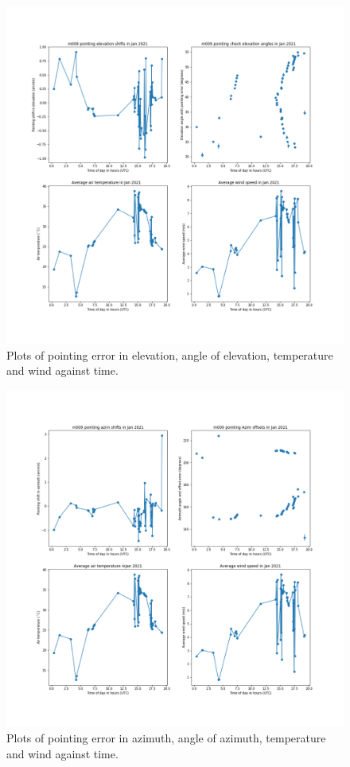 \documentclass{article}
\begin{document}
\begin{figure}[H]
	\includegraphics[scale=0.45]{m009_elev_Jan_mapped.png}
	
	\caption{Plots of pointing error in elevation, angle of elevation, temperature and wind against time.}
	\label{fig:m009ElevJanMapped}
\end{figure}

\begin{figure}[H]
	\centering
	\includegraphics[scale=0.45]{m009_azim_Jan_mapped.png}
	
	\caption{Plots of pointing error in azimuth, angle of azimuth, temperature and wind against time.}
	\label{fig:m009AzimJanMapped}
\end{figure}
\end{document}
